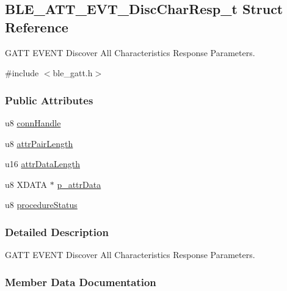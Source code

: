 \hypertarget{struct_b_l_e___a_t_t___e_v_t___disc_char_resp__t}{}\subsection{B\+L\+E\+\_\+\+A\+T\+T\+\_\+\+E\+V\+T\+\_\+\+Disc\+Char\+Resp\+\_\+t Struct Reference}
\label{struct_b_l_e___a_t_t___e_v_t___disc_char_resp__t}


G\+A\+TT E\+V\+E\+NT Discover All Characteristics Response Parameters.  




{\ttfamily \#include $<$ble\+\_\+gatt.\+h$>$}

\subsubsection*{Public Attributes}
\begin{DoxyCompactItemize}
\item 
u8 \hyperlink{struct_b_l_e___a_t_t___e_v_t___disc_char_resp__t_ae78e5f0c0fbab21b076fa1c0596936e5}{conn\+Handle}
\item 
u8 \hyperlink{struct_b_l_e___a_t_t___e_v_t___disc_char_resp__t_ab481fffe55fab5048f5968be9aa92beb}{attr\+Pair\+Length}
\item 
u16 \hyperlink{struct_b_l_e___a_t_t___e_v_t___disc_char_resp__t_a9d9aa7246957413d788ea0655f549a20}{attr\+Data\+Length}
\item 
u8 X\+D\+A\+TA $\ast$ \hyperlink{struct_b_l_e___a_t_t___e_v_t___disc_char_resp__t_ac6460efa796aec00f562934e74b839dc}{p\+\_\+attr\+Data}
\item 
u8 \hyperlink{struct_b_l_e___a_t_t___e_v_t___disc_char_resp__t_acc1027ec96ed2ad406e3607da998d910}{procedure\+Status}
\end{DoxyCompactItemize}


\subsubsection{Detailed Description}
G\+A\+TT E\+V\+E\+NT Discover All Characteristics Response Parameters. 

\subsubsection{Member Data Documentation}
